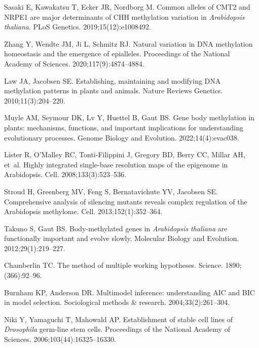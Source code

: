 \documentclass[10pt,letterpaper]{article}
\begin{document}
\begin{thebibliography}{10}
Sasaki E, Kawakatsu T, Ecker JR, Nordborg M.
\newblock Common alleles of CMT2 and NRPE1 are major determinants of CHH methylation variation in \emph{Arabidopsis thaliana}.
\newblock PLoS Genetics. 2019;15(12):e1008492.

Zhang Y, Wendte JM, Ji L, Schmitz RJ.
\newblock Natural variation in DNA methylation homeostasis and the emergence of epialleles.
\newblock Proceedings of the National Academy of Sciences. 2020;117(9):4874--4884.

Law JA, Jacobsen SE.
\newblock Establishing, maintaining and modifying DNA methylation patterns in plants and animals.
\newblock Nature Reviews Genetics. 2010;11(3):204--220.

Muyle AM, Seymour DK, Lv Y, Huettel B, Gaut BS.
\newblock Gene body methylation in plants: mechanisms, functions, and important implications for understanding evolutionary processes.
\newblock Genome Biology and Evolution. 2022;14(4):evac038.

Lister R, O'Malley RC, Tonti-Filippini J, Gregory BD, Berry CC, Millar AH, et~al.
\newblock Highly integrated single-base resolution maps of the epigenome in Arabidopsis.
\newblock Cell. 2008;133(3):523--536.

Stroud H, Greenberg MV, Feng S, Bernatavichute YV, Jacobsen SE.
\newblock Comprehensive analysis of silencing mutants reveals complex regulation of the Arabidopsis methylome.
\newblock Cell. 2013;152(1):352--364.

Takuno S, Gaut BS.
\newblock Body-methylated genes in \emph{Arabidopsis thaliana} are functionally important and evolve slowly.
\newblock Molecular Biology and Evolution. 2012;29(1):219--227.

Chamberlin TC.
\newblock The method of multiple working hypotheses.
\newblock Science. 1890;(366):92--96.

Burnham KP, Anderson DR.
\newblock Multimodel inference: understanding AIC and BIC in model selection.
\newblock Sociological methods \& research. 2004;33(2):261--304.

Niki Y, Yamaguchi T, Mahowald AP.
\newblock Establishment of stable cell lines of \emph{Drosophila} germ-line stem cells.
\newblock Proceedings of the National Academy of Sciences. 2006;103(44):16325--16330.


\end{thebibliography}
\end{document}
